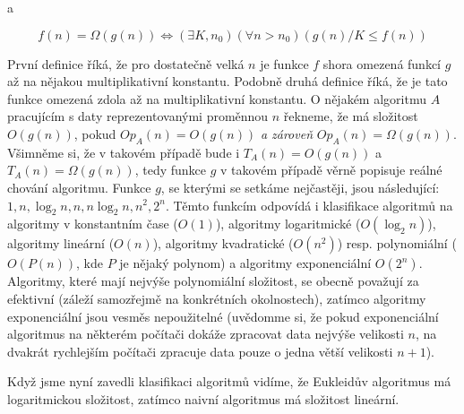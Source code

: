 a

\begin{displaymath}
 f(n) = \Omega(g(n)) \iff (\exists K,n_0)(\forall n>n_0)(g(n)/K\leq f(n))
\end{displaymath}

První definice říká, že pro dostatečně velká $n$ je funkce $f$ shora omezená funkcí $g$ až na nějakou multiplikativní konstantu. Podobně
druhá definice říká, že je tato funkce omezená zdola až na multiplikativní konstantu. O nějakém algoritmu $A$ pracujícím s daty reprezentovanými
proměnnou $n$ řekneme, že má složitost $O(g(n))$, pokud $Op_A(n) = O(g(n))$ \emph{a zároveň} $Op_A(n) = \Omega(g(n))$. Všimněme si, že v takovém
případě bude i $T_A(n) = O(g(n))$ a $T_A(n)=\Omega(g(n))$, tedy funkce $g$ v takovém případě věrně popisuje reálné chování algoritmu. Funkce $g$,
se kterými se setkáme nejčastěji, jsou následující: $1, n, \log_2 n, n, n\log_2 n, n^2, 2^n$. Těmto funkcím odpovídá i klasifikace algoritmů na
algoritmy v konstantním čase ($O(1)$), algoritmy logaritmické ($O(\log_2 n)$), algoritmy lineární ($O(n)$), algoritmy kvadratické ($O(n^2)$) resp.
polynomiální ($O(P(n))$, kde $P$ je nějaký polynom) a algoritmy exponenciální $O(2^n)$. Algoritmy, které mají nejvýše polynomiální složitost, se
obecně považují za efektivní (záleží samozřejmě na konkrétních okolnostech), zatímco algoritmy exponenciální jsou vesměs nepoužitelné (uvědomme si,
že pokud exponenciální algoritmus na některém počítači dokáže zpracovat data nejvýše velikosti $n$, na dvakrát rychlejším počítači zpracuje data
pouze o jedna větší velikosti $n+1$).

Když jsme nyní zavedli klasifikaci algoritmů vidíme, že Eukleidův algoritmus má logaritmickou složitost, zatímco naivní algoritmus má složitost
lineární.

\ifx\ucebnice\undefined

\fi
